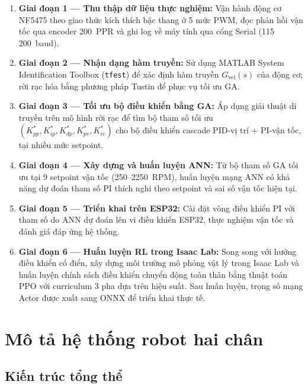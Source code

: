 \begin{enumerate}
    \item \textbf{Giai đoạn 1 — Thu thập dữ liệu thực nghiệm:}
    Vận hành động cơ NF5475 theo giao thức kích thích bậc thang ở 5 mức PWM,
    đọc phản hồi vận tốc qua encoder 200~PPR và ghi log về máy tính qua
    cổng Serial (115\,200~baud).

    \item \textbf{Giai đoạn 2 — Nhận dạng hàm truyền:}
    Sử dụng MATLAB System Identification Toolbox (\texttt{tfest}) để xác định
    hàm truyền $G_{\text{vel}}(s)$ của động cơ; rời rạc hóa bằng phương pháp
    Tustin để phục vụ tối ưu GA.

    \item \textbf{Giai đoạn 3 — Tối ưu bộ điều khiển bằng GA:}
    Áp dụng giải thuật di truyền trên mô hình rời rạc để tìm bộ tham số tối
    ưu $(K_{pp}^*, K_{ip}^*, K_{dp}^*, K_{pv}^*, K_{iv}^*)$ cho bộ điều
    khiển cascade PID-vị trí + PI-vận tốc, tại nhiều mức setpoint.

    \item \textbf{Giai đoạn 4 — Xây dựng và huấn luyện ANN:}
    Từ bộ tham số GA tối ưu tại 9 setpoint vận tốc (250--2250~RPM),
    huấn luyện mạng ANN có khả năng dự đoán tham số PI thích nghi theo
    setpoint và sai số vận tốc hiện tại.

    \item \textbf{Giai đoạn 5 — Triển khai trên ESP32:}
    Cài đặt vòng điều khiển PI với tham số do ANN dự đoán lên vi điều khiển
    ESP32, thực nghiệm vận tốc và đánh giá đáp ứng hệ thống.

    \item \textbf{Giai đoạn 6 — Huấn luyện RL trong Isaac Lab:}
    Song song với hướng điều khiển cổ điển, xây dựng môi trường mô phỏng
    vật lý trong Isaac Lab và huấn luyện chính sách điều khiển chuyển động
    toàn thân bằng thuật toán PPO với curriculum 3 pha dựa trên hiệu suất.
    Sau huấn luyện, trọng số mạng Actor được xuất sang ONNX để triển khai
    thực tế.
\end{enumerate}

\section{Mô tả hệ thống robot hai chân}

\subsection{Kiến trúc tổng thể}


